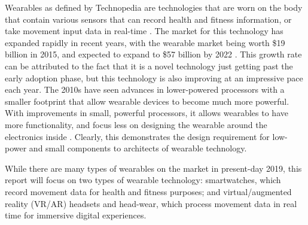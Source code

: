 Wearables as defined by Technopedia are technologies that are worn on
the body that contain various sensors that can record health and fitness
information, or take movement input data in real-time \cite{technopedia_defn}.
The market for this technology has expanded rapidly in recent years, with the
wearable market being worth \$19 billion in 2015, and expected to expand to \$57 billion
by 2022 \cite{market_growth}. This growth rate can be attributed to the fact that it is a novel
technology just getting past the early adoption phase, but this technology is also improving
at an impressive pace each year. The 2010s have seen advances in lower-powered processors with 
a smaller footprint that allow wearable devices to become much more powerful. With improvements in
small, powerful processors, it allows wearables to have more functionality, and focus less on
designing the wearable around the electronics inside \cite{wearable_rev}. Clearly, this demonstrates
the design requirement for low-power and small components to architects of wearable technology.

While there are many types of wearables on the market in present-day 2019, this report will
focus on two types of wearable technology: smartwatches, which record movement data
for health and fitness purposes; and virtual/augmented reality (VR/AR) headsets
and head-wear, which process movement data in real time for immersive digital experiences.